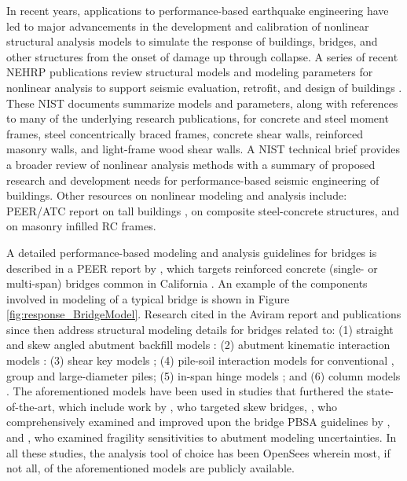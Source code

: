 In recent years, applications to performance-based earthquake engineering have led to major advancements in the development and calibration of nonlinear structural analysis models to simulate the response of buildings, bridges, and other structures from the onset of damage up through collapse. A series of recent NEHRP publications review structural models and modeling parameters for nonlinear analysis to support seismic evaluation, retrofit, and design of buildings \citep{nist2017guidelines,nist2017guidelinesa,nist2017guidelinesb}. These NIST documents summarize models and parameters, along with references to many of the underlying research publications, for concrete and steel moment frames, steel concentrically braced frames, concrete shear walls, reinforced masonry walls, and light-frame wood shear walls. A NIST technical brief \citep{deierlein2010nonlinear} provides a broader review of nonlinear analysis methods with a summary of proposed research and development needs for performance-based seismic engineering of buildings. Other resources on nonlinear modeling and analysis include: PEER/ATC report on tall buildings \citep{malley2010modeling}, \cite{spacone2004nonlinear} on composite steel-concrete structures, and \cite{nurbaiah2017modelling} on masonry infilled RC frames.

A detailed performance-based modeling and analysis guidelines for bridges is described in a PEER report by \cite{aviram2008guidelines}, which targets reinforced concrete (single- or multi-span) bridges common in California \citep{nbi2016national}. An example of the components involved in modeling of a typical bridge is shown in Figure \ref{fig:response_BridgeModel}. Research cited in the Aviram report and publications since then address structural modeling details for bridges related to: (1) straight and skew angled abutment backfill models \citep{shamsabadi2010validated}: (2) abutment kinematic interaction models \citep{zhang2002kinematic}: (3) shear key models \citep[e.g.][]{silva2009seismic}; (4) pile-soil interaction models for conventional \citep{hutchinson2001inelastic, taciroglu2006robust}, group \citep{lemnitzer2010nonlinear} and large-diameter \citep{khalili-tehrani2014nonlinear} piles; (5) in-span hinge models \citep{hube2008experimental}; and (6) column models \citep{terzic2015concrete, xu2011hysteretic}. The aforementioned models have been used in studies that furthered the state-of-the-art, which include work by \cite{kaviani2014performancebased}, who targeted skew bridges, \cite{omrani2015guidelines}, who comprehensively examined and improved upon the bridge PBSA guidelines by \cite{aviram2008guidelines}, and \cite{omrani2017variability}, who examined fragility sensitivities to abutment modeling uncertainties. In all these studies, the analysis tool of choice has been OpenSees \citep{mckenna2011opensees} wherein most, if not all, of the aforementioned models are publicly available. 

